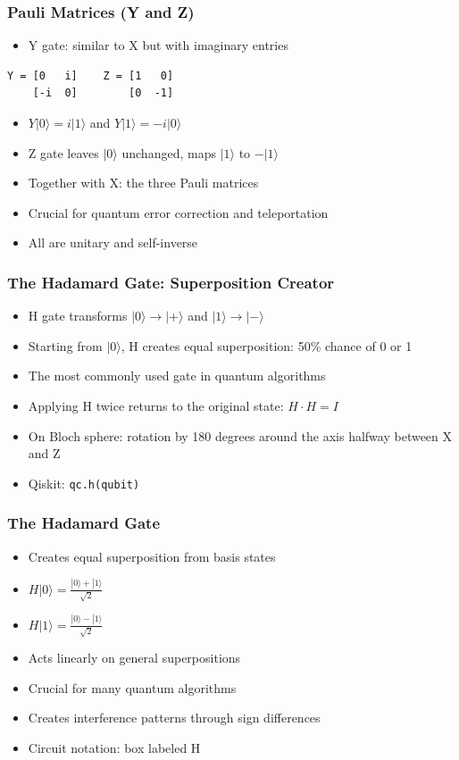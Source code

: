 \begin{frame}[fragile]\frametitle{Pauli Matrices (Y and Z)}
\begin{itemize}
\item Y gate: similar to X but with imaginary entries
\end{itemize}
\begin{lstlisting}
Y = [0   i]    Z = [1   0]
    [-i  0]        [0  -1]
\end{lstlisting}
\begin{itemize}
\item $Y|0\rangle = i|1\rangle$ and $Y|1\rangle = -i|0\rangle$
\item Z gate leaves $|0\rangle$ unchanged, maps $|1\rangle$ to $-|1\rangle$
\item Together with X: the three Pauli matrices
\item Crucial for quantum error correction and teleportation
\item All are unitary and self-inverse
\end{itemize}
\end{frame}

\begin{frame}[fragile]\frametitle{The Hadamard Gate: Superposition Creator}
\begin{itemize}
\item H gate transforms $|0\rangle \to |+\rangle$ and $|1\rangle \to |-\rangle$
\item Starting from $|0\rangle$, H creates equal superposition: 50\% chance of 0 or 1
\item The most commonly used gate in quantum algorithms
\item Applying H twice returns to the original state: $H \cdot H = I$
\item On Bloch sphere: rotation by 180 degrees around the axis halfway between X and Z
\item Qiskit: \texttt{qc.h(qubit)}
\end{itemize}
\end{frame}

\begin{frame}[fragile]\frametitle{The Hadamard Gate}
\begin{itemize}
\item Creates equal superposition from basis states
\item $H|0\rangle = \frac{|0\rangle + |1\rangle}{\sqrt{2}}$
\item $H|1\rangle = \frac{|0\rangle - |1\rangle}{\sqrt{2}}$
\item Acts linearly on general superpositions
\item Crucial for many quantum algorithms
\item Creates interference patterns through sign differences
\item Circuit notation: box labeled H
\end{itemize}
\end{frame}

